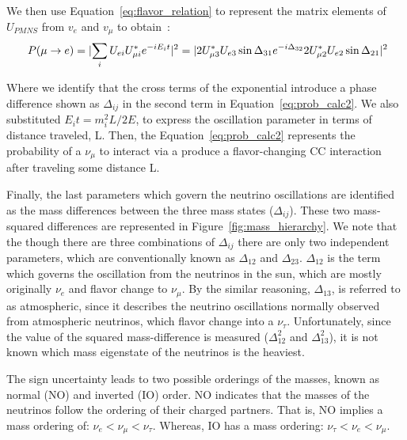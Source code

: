 We then use Equation~\ref{eq:flavor_relation} to represent the matrix elements of $U_{PMNS}$ from $v_{e}$ and $v_{\mu}$  to obtain~\citep{Nunokawa_2008}:
\begin{equation}~\label{eq:prob_calc2}
  P(\mu \rightarrow e)
  = \lvert \sum_{i} U_{e i} U^{*}_{\mu i} e^{-i E_{i}t} \rvert^{2} \\
  = \lvert 2U^{*}_{\mu 3}U_{e3}\sin \Delta_{31}e^{-i\Delta_{32}} 2U^{*}_{\mu 2}U_{e2}\sin \Delta_{21} \rvert^{2}
\end{equation}

Where we identify that the cross terms of the exponential introduce a phase difference shown as $\Delta_{ij}$ in the second term in Equation~\ref{eq:prob_calc2}.
We also substituted $E_{i}t = m^{2}_{i}L/2E$, to express the oscillation parameter in terms of distance traveled, L.
Then, the Equation~\ref{eq:prob_calc2} represents the probability of a $\nu_{\mu}$ to interact via a produce a flavor-changing CC interaction after traveling some distance L.

Finally, the last parameters which govern the neutrino oscillations are identified as the mass differences between the three mass states ($\Delta_{ij}$).
These two mass-squared differences are represented in Figure~\ref{fig:mass_hierarchy}.
We note that the though there are three combinations of $\Delta_{ij}$ there are only two independent parameters, which are conventionally known as $\Delta_{12}$ and $\Delta_{23}$.
$\Delta_{12}$ is the term which governs the oscillation from the neutrinos in the sun, which are mostly originally $\nu_{e}$ and flavor change to $\nu_{\mu}$.
By the similar reasoning, $\Delta_{13}$, is referred to as atmospheric, since it describes the neutrino oscillations normally observed from atmospheric neutrinos, which flavor change into a $\nu_{\tau}$.
Unfortunately, since the value of the squared mass-difference is measured ($\Delta_{12}^{2}$ and $\Delta_{13}^{2}$), it is not known which mass eigenstate of the neutrinos is the heaviest.

The sign uncertainty leads to two possible orderings of the masses, known as normal (NO) and inverted (IO) order.
NO indicates that the masses of the neutrinos follow the ordering of their charged partners.
That is, NO implies a mass ordering of: $\nu_{e} < \nu_{\mu} < \nu_{\tau}$.
Whereas, IO has a mass ordering: $\nu_{\tau} < \nu_{e} < \nu_{\mu}$.

